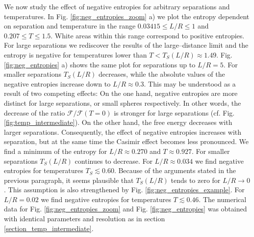 We now study the effect of negative entropies for arbitrary separations and
temperatures. In Fig. \ref{fig:neg_entropies_zoom} a) we plot the entropy
dependent on separation and temperature in the range $0.03415 \le L/R \le 1$
and $0.207 \le T \le 1.5$. White areas within this range correspond to positive
entropies. For large separations we rediscover the results of the
large--distance limit and the entropy is negative for temperatures lower than
$T < T_S(L/R) \approx 1.49$. Fig. \ref{fig:neg_entropies} a) shows the same
plot for separations up to $L/R=5$. For smaller separations $T_S(L/R)$
decreases, while the absolute values of the negative entropies increase down to
$L/R\approx0.3$. This may be understood as a result of two competing effects:
On the one hand, negative entropies are more distinct for large separations, or
small spheres respectively. In other words, the decrease of the ratio
$\mathcal{F}/\mathcal{F}(T=0)$ is stronger for large separations (cf. Fig.
\ref{fig:temp_intermediate}). On the other hand, the free energy decreases with
larger separations. Consequently, the effect of negative entropies increases
with separation, but at the same time the Casimir effect becomes less
pronounced. We find a minimum of the entropy for $L/R\approx0.270$ and
$T\approx0.927$. For smaller separations $T_S(L/R)$ continues to decrease. For
$L/R\approx0.034$ we find negative entropies for temperatures
$T_S\lesssim0.60$. Because of the arguments stated in the previous paragraph,
it seems plausible that $T_S(L/R)$ tends to zero for $L/R\to0$. This
assumption is also strengthened by Fig. \ref{fig:neg_entropies_example}. For
$L/R=0.02$ we find negative entropies for temperatures $T \lesssim 0.46$. The
numerical data for Fig. \ref{fig:neg_entropies_zoom} and Fig.
\ref{fig:neg_entropies} was obtained with identical parameters and resolution
as in section \ref{section_temp_intermediate}.

